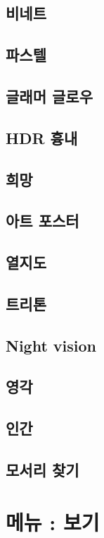 \documentclass[12pt, a4paper, oneside]{book}
\let\stdsection\section
\renewcommand\section{\newpage\stdsection}
\begin{document}
\section{	비네트				}							
\section{	파스텔				}							
\section{	글래머 글로우				}							
\section{	HDR 흉내				}							
\section{	희망				}							
\section{	아트 포스터				}							
\section{	열지도				}							
\section{	트리톤				}							
\section{	Night vision				}							
\section{	영각				}							
\section{	인간				}							
\section{	모서리 찾기				}							



	\chapter{메뉴 : 보기} 
	\minitoc
\end{document}
